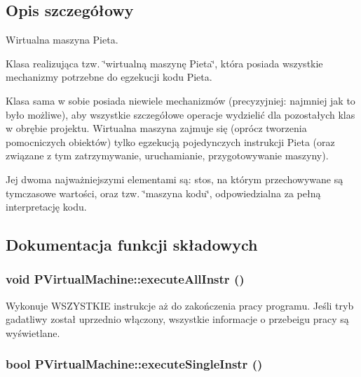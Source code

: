 \subsection{Opis szczegółowy}
Wirtualna maszyna Pieta. 

Klasa realizująca tzw. \char`\"{}wirtualną maszynę Pieta\char`\"{}, która posiada wszystkie mechanizmy potrzebne do egzekucji kodu Pieta.

Klasa sama w sobie posiada niewiele mechanizmów (precyzyjniej: najmniej jak to było możliwe), aby wszystkie szczegółowe operacje wydzielić dla pozostałych klas w obrębie projektu. Wirtualna maszyna zajmuje się (oprócz tworzenia pomocniczych obiektów) tylko egzekucją pojedynczych instrukcji Pieta (oraz związane z tym zatrzymywanie, uruchamianie, przygotowywanie maszyny).

Jej dwoma najważniejszymi elementami są: stos, na którym przechowywane są tymczasowe wartości, oraz tzw. \char`\"{}maszyna kodu\char`\"{}, odpowiedzialna za pełną interpretację kodu. 

\subsection{Dokumentacja funkcji składowych}
\hypertarget{classPVirtualMachine_40e1780e122ce7fe4ebadc526c47fbea}{
\subsubsection[{executeAllInstr}]{\setlength{\rightskip}{0pt plus 5cm}void PVirtualMachine::executeAllInstr ()}}
\label{classPVirtualMachine_40e1780e122ce7fe4ebadc526c47fbea}


Wykonuje WSZYSTKIE instrukcje aż do zakończenia pracy programu. Jeśli tryb gadatliwy został uprzednio włączony, wszystkie informacje o przebeigu pracy są wyświetlane. \hypertarget{classPVirtualMachine_7bbb22aabe782de2208139bc01f65050}{
\subsubsection[{executeSingleInstr}]{\setlength{\rightskip}{0pt plus 5cm}bool PVirtualMachine::executeSingleInstr ()}}
\label{classPVirtualMachine_7bbb22aabe782de2208139bc01f65050}


